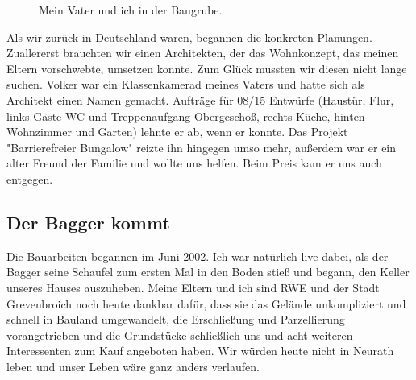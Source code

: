 \documentclass[fontsize=14pt,a4paper,headinclude,DIV=calc,automark]{scrbook}
\begin{document}
\setlength{\fboxsep}{0pt}    %
\setlength{\fboxrule}{0.2pt} %
\begin{figure}[ht]
    \centering
    \caption{Mein Vater und ich in der Baugrube.}
    \label{fig:baugrube}
\end{figure}

Als wir zurück in Deutschland waren, begannen die konkreten Planungen. Zuallererst brauchten wir einen Architekten, der das Wohnkonzept, das meinen Eltern vorschwebte, umsetzen konnte. Zum Glück mussten wir diesen nicht lange suchen. Volker war ein Klassenkamerad meines Vaters und hatte sich als Architekt einen Namen gemacht. Aufträge für 08/15 Entwürfe (Haustür, Flur, links Gäste-WC und Treppenaufgang Obergeschoß, rechts Küche, hinten Wohnzimmer und Garten) lehnte er ab, wenn er konnte. Das Projekt "Barrierefreier Bungalow" reizte ihn hingegen umso mehr, außerdem war er ein alter Freund der Familie und wollte uns helfen. Beim Preis kam er uns auch entgegen.

\subsection{Der Bagger kommt}

Die Bauarbeiten begannen im Juni 2002. Ich war natürlich live dabei, als der Bagger seine Schaufel zum ersten Mal in den Boden stieß und begann, den Keller unseres Hauses auszuheben. Meine Eltern und ich sind RWE und der Stadt Grevenbroich noch heute dankbar dafür, dass sie das Gelände unkompliziert und schnell in Bauland umgewandelt, die Erschließung und Parzellierung vorangetrieben und die Grundstücke schließlich uns und acht weiteren Interessenten zum Kauf angeboten haben. Wir würden heute nicht in Neurath leben und unser Leben wäre ganz anders verlaufen.
\end{document}
